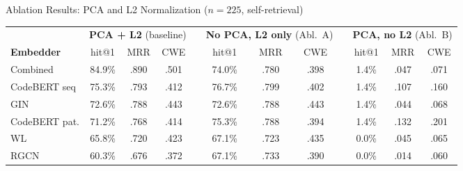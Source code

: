 \documentclass[aspectratio=169,10pt]{beamer}
\newcommand{\chit}[1]{\cellcolor{hit!30} #1}
\newcommand{\cmiss}[1]{\cellcolor{miss!25} #1}
\newcommand{\cwarn}[1]{\cellcolor{warn!30} #1}
\begin{document}
\begin{frame}{Ablation Results: PCA and L2 Normalization ($n{=}225$, self-retrieval)}

  \centering
  \vspace{0.2em}
  {\small
  \renewcommand{\arraystretch}{1.35}
  \setlength{\tabcolsep}{5pt}
  \begin{tabular}{l *{3}{c} c *{3}{c} c *{3}{c}}
    \toprule
    & \multicolumn{3}{c}{\textbf{PCA + L2} {\footnotesize(baseline)}}
    && \multicolumn{3}{c}{\textbf{No PCA, L2 only} {\footnotesize(Abl.\ A)}}
    && \multicolumn{3}{c}{\textbf{PCA, no L2} {\footnotesize(Abl.\ B)}} \\
    \cmidrule{2-4} \cmidrule{6-8} \cmidrule{10-12}
    \textbf{Embedder}
      & hit@1 & MRR & CWE
      && hit@1 & MRR & CWE
      && hit@1 & MRR & CWE \\
    \midrule
    \rowcolor{c1!12}
    Combined
      & \chit{84.9\%} & \chit{.890} & \chit{.501}
      && \cwarn{74.0\%} & .780 & .398
      && \cmiss{1.4\%} & .047 & .071 \\
    CodeBERT seq
      & 75.3\% & .793 & .412
      && 76.7\% & .799 & .402
      && \cmiss{1.4\%} & .107 & .160 \\
    GIN
      & 72.6\% & .788 & .443
      && 72.6\% & .788 & .443
      && \cmiss{1.4\%} & .044 & .068 \\
    CodeBERT pat.
      & 71.2\% & .768 & .414
      && 75.3\% & .788 & .394
      && \cmiss{1.4\%} & .132 & .201 \\
    WL
      & 65.8\% & .720 & .423
      && 67.1\% & .723 & .435
      && \cmiss{0.0\%} & .045 & .065 \\
    RGCN
      & 60.3\% & .676 & .372
      && \cwarn{67.1\%} & .733 & .390
      && \cmiss{0.0\%} & .014 & .060 \\
    \bottomrule
  \end{tabular}}


\end{frame}
\end{document}
